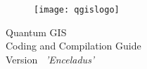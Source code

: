 
\begin{titlepage}
\begin{center}

\begin{figure}[H]
\begin{center}
\texttt{[image: qgislogo]} 
\end{center}
\end{figure}

\Huge{Quantum GIS}\\
\vspace{0.5cm}
\Large{Coding and Compilation Guide} \\
\vspace{0.5cm}
\Large{Version ~\CURRENT \textsl{'Enceladus'}}

\end{center}
\end{titlepage}
